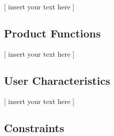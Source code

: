 \documentclass[twoside,letterpaper]{article}
\begin{document}
[ insert your text here ]

\subsection{Product Functions}

[ insert your text here ]

\subsection{User Characteristics}

[ insert your text here ] %

\subsection{Constraints}
\end{document}
